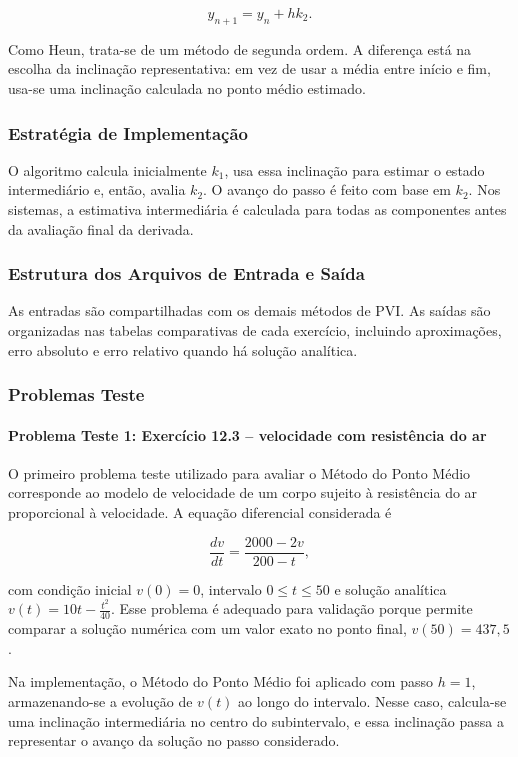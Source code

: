 \[
    y_{n+1}=y_n+h k_2.
\]

Como Heun, trata-se de um método de segunda ordem. A diferença está na escolha da inclinação representativa: em vez de usar a média entre início e fim, usa-se uma inclinação calculada no ponto médio estimado.

\subsubsection{Estratégia de Implementação}

O algoritmo calcula inicialmente \(k_1\), usa essa inclinação para estimar o estado intermediário e, então, avalia \(k_2\). O avanço do passo é feito com base em \(k_2\). Nos sistemas, a estimativa intermediária é calculada para todas as componentes antes da avaliação final da derivada.

\subsubsection{Estrutura dos Arquivos de Entrada e Saída}

As entradas são compartilhadas com os demais métodos de PVI. As saídas são organizadas nas tabelas comparativas de cada exercício, incluindo aproximações, erro absoluto e erro relativo quando há solução analítica.

\subsubsection{Problemas Teste}

\paragraph{Problema Teste 1: Exercício 12.3 -- velocidade com resistência do ar}

O primeiro problema teste utilizado para avaliar o Método do Ponto Médio corresponde ao modelo de velocidade de um corpo sujeito à resistência do ar proporcional à velocidade. A equação diferencial considerada é

\[
    \frac{dv}{dt}=\frac{2000-2v}{200-t},
\]

com condição inicial \(v(0)=0\), intervalo \(0\leq t\leq 50\) e solução analítica \(v(t)=10t-\frac{t^2}{40}\). Esse problema é adequado para validação porque permite comparar a solução numérica com um valor exato no ponto final, \(v(50)=437{,}5\).

Na implementação, o Método do Ponto Médio foi aplicado com passo \(h=1\), armazenando-se a evolução de \(v(t)\) ao longo do intervalo. Nesse caso, calcula-se uma inclinação intermediária no centro do subintervalo, e essa inclinação passa a representar o avanço da solução no passo considerado.

